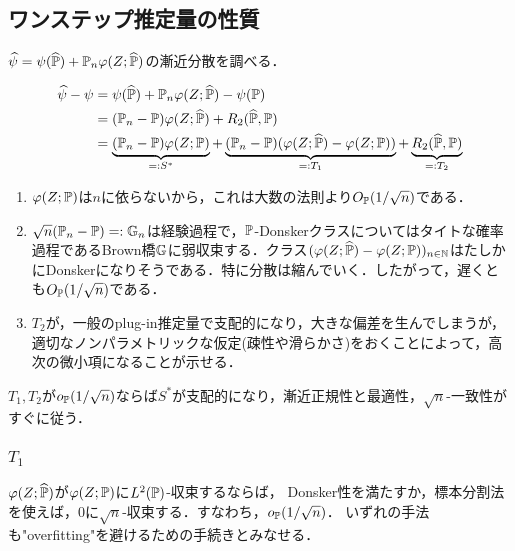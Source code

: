 \documentclass[uplatex,dvipdfmx]{jsreport}
\begin{document}
\subsection{ワンステップ推定量の性質}

\begin{tcolorbox}[colframe=ForestGreen, colback=ForestGreen!10!white,breakable,colbacktitle=ForestGreen!40!white,coltitle=black,fonttitle=\bfseries\sffamily,
title=]
    $\widehat{\psi}=\psi(\widehat{\mathbb{P}})+\mathbb{P}_n\varphi(Z;\widehat{\mathbb{P}})$の漸近分散を調べる．
\end{tcolorbox}

\begin{discussion}[ワンステップ推定量の偏差の標準分解]
    \begin{align*}
        \widehat{\psi}-\psi&=\psi(\widehat{\mathbb{P}})+\mathbb{P}_n\varphi(Z;\widehat{\mathbb{P}})-\psi(\mathbb{P})\\
        &=(\mathbb{P}_n-\mathbb{P})\varphi(Z;\widehat{\mathbb{P}})+R_2(\widehat{\mathbb{P}},\mathbb{P})\\
        &=\underbrace{(\mathbb{P}_n-\mathbb{P})\varphi(Z;\mathbb{P})}_{=:S^*}+\underbrace{(\mathbb{P}_n-\mathbb{P})(\varphi(Z;\widehat{\mathbb{P}})-\varphi(Z;\mathbb{P}))}_{=:T_1}+\underbrace{R_2(\widehat{\mathbb{P}},\mathbb{P})}_{=:T_2}
    \end{align*}
    \begin{enumerate}
        \item $\varphi(Z;\mathbb{P})$は$n$に依らないから，これは大数の法則より$O_{\mathbb{P}}(1/\sqrt{n})$である．
        \item $\sqrt{n}(\mathbb{P}_n-\mathbb{P})=:\mathbb{G}_n$は経験過程で，$\mathbb{P}$-Donskerクラスについてはタイトな確率過程であるBrown橋$\mathbb{G}$に弱収束する．クラス$(\varphi(Z;\widehat{\mathbb{P}})-\varphi(Z;\mathbb{P}))_{n\in\mathbb{N}}$はたしかにDonskerになりそうである．特に分散は縮んでいく．したがって，遅くとも$O_{\mathbb{P}}(1/\sqrt{n})$である．
        \item $T_2$が，一般のplug-in推定量で支配的になり，大きな偏差を生んでしまうが，適切なノンパラメトリックな仮定(疎性や滑らかさ)をおくことによって，高次の微小項になることが示せる．
    \end{enumerate}
    $T_1,T_2$が$o_{\mathbb{P}}(1/\sqrt{n})$ならば$S^*$が支配的になり，漸近正規性と最適性，$\sqrt{n}$-一致性がすぐに従う．
\end{discussion}

\subsubsection{$T_1$}

\begin{tcolorbox}[colframe=ForestGreen, colback=ForestGreen!10!white,breakable,colbacktitle=ForestGreen!40!white,coltitle=black,fonttitle=\bfseries\sffamily,
title=]
    $\varphi(Z;\widehat{\mathbb{P}})$が$\varphi(Z;\mathbb{P})$に$L^2(\mathbb{P})$-収束するならば，
    Donsker性を満たすか，標本分割法を使えば，$0$に$\sqrt{n}$-収束する．すなわち，$o_{\mathbb{P}}(1/\sqrt{n})$．
    いずれの手法も"overfitting"を避けるための手続きとみなせる．
\end{tcolorbox}
\end{document}
